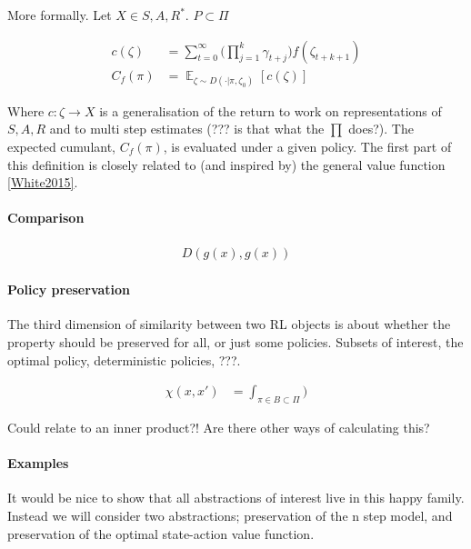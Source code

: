 More formally. Let $X \in {S, A, R}^{* }$. $P \subset \Pi$

\begin{align*}
c(\zeta) &= \sum_{t=0}^{\infty} \big( \prod_{j=1}^k\gamma_{t+j}\big)  f(\zeta_{t+k+1}) \\
C_f(\pi) &= \mathop{\mathbb E}_{\zeta \sim D(\cdot | \pi, \zeta_0)} [c(\zeta)]
\end{align*}

Where $c: \zeta \to X$ is a generalisation of the return to work on representations of $S, A, R$ and to multi step estimates (??? is that what the $\prod$ does?).
The expected cumulant, $C_f(\pi)$, is evaluated under a given policy.
The first part of this definition is closely related to (and inspired by) the general value function \ref{White2015}.

\paragraph{Comparison}


\begin{align*}
D(g(x), g(x))
\end{align*}

\paragraph{Policy preservation}

The third dimension of similarity between two RL objects is about whether the
property should be preserved for all, or just some policies. Subsets of interest, the optimal policy, deterministic policies, ???.

\begin{align*}
\chi(x, x') &= \int_{\pi \in B\subset \Pi} )
\end{align*}

Could relate to an inner product?! Are there other ways of calculating this?



\paragraph{Examples}

It would be nice to show that all abstractions of interest live in this happy family.
Instead we will consider two abstractions; preservation of the n step model, and
preservation of the optimal state-action value function.


